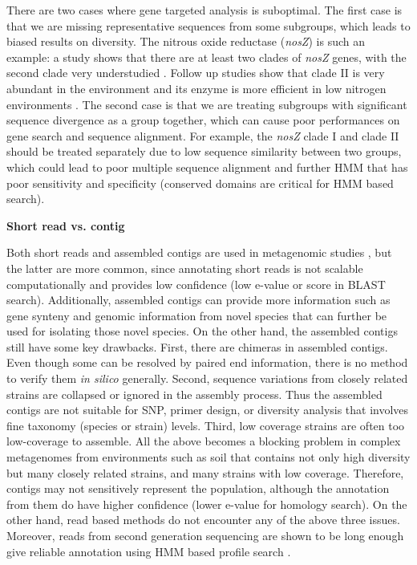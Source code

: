 \documentclass[]{msu-thesis}
\begin{document}
There are two cases where gene targeted analysis is suboptimal.  The
first case is that we are missing representative sequences from some
subgroups, which leads to biased results on diversity. The nitrous oxide
reductase (\textit{nosZ}) is such an example: a study shows that there
are at least two clades of \textit{nosZ} genes, with the second clade
very understudied \cite{sanford_unexpected_2012}. Follow up studies show
that clade II is very abundant in the environment and its enzyme is more
efficient in low nitrogen environments \cite{yoon_nitrous_2016}.  The
second case is that we are treating subgroups with significant sequence
divergence as a group together, which can cause poor performances on
gene search and sequence alignment. For example, the \textit{nosZ} clade
I and clade II should be treated separately due to low sequence similarity
between two groups, which could lead to poor multiple sequence alignment
and further HMM that has poor sensitivity and specificity (conserved
domains are critical for HMM based search).

\textbf{Short read vs. contig }

Both short reads and assembled contigs are used in metagenomic studies
\cite{fierer_cross-biome_2012,qin_human_2010,howe_tackling_2014}, but
the latter are more common, since annotating short reads is not
scalable computationally and provides low confidence (low e-value or
score in BLAST search). Additionally, assembled contigs can provide more
information such as gene synteny and genomic information from novel
species that can further be used for isolating those novel species.
On the other hand, the assembled contigs still have some key drawbacks.
First, there are chimeras in assembled contigs. Even though some can be
resolved by paired end information, there is no method to verify them
\textit{in silico} generally. Second, sequence variations from closely
related strains are collapsed or ignored in the assembly process. Thus
the assembled contigs are not suitable for SNP, primer design, or
diversity analysis that involves fine taxonomy (species or strain)
levels. Third, low coverage strains are often too low-coverage to
assemble. All the above becomes a blocking problem in complex
metagenomes from environments such as soil that contains not only high
diversity but many closely related strains, and many strains with low
coverage. Therefore, contigs may not sensitively represent the
population, although the annotation from them do have higher confidence
(lower e-value for homology search). On the other hand, read based
methods do not encounter any of the above three issues.  Moreover, reads
from second generation sequencing are shown to be long enough give
reliable annotation using HMM based profile search
\cite{zhang_metadomain:_2012}.
\end{document}
